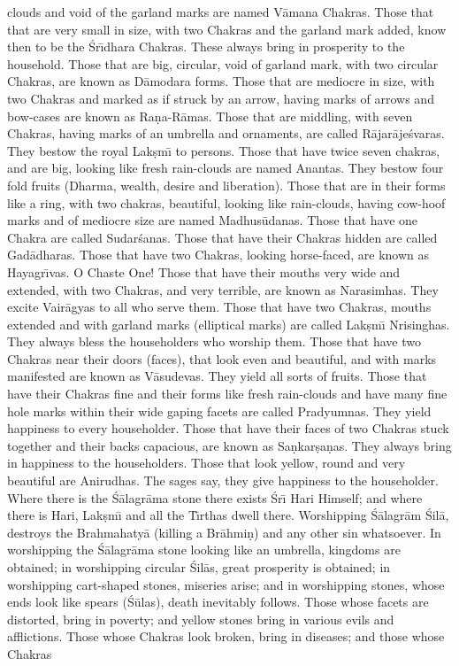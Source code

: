 clouds and void of the garland marks are named V\=amana Chakras. Those that that are very small in size, with two Chakras and the garland mark added, know then to be the \'Sr\={\i}dhara Chakras. These always bring in prosperity to the household. Those that are big, circular, void of garland mark, with two circular Chakras, are known as D\=amodara forms. Those that are mediocre in size, with two Chakras and marked as if struck by an arrow, having marks of arrows and bow-cases are known as Ra\d{n}a-R\=amas. Those that are middling, with seven Chakras, having marks of an umbrella and ornaments, are called R\=ajar\=aje\'svaras. They bestow the royal Lak\d{s}m\={\i} to persons. Those that have twice seven chakras, and are big, looking like fresh rain-clouds are named Anantas. They bestow four fold fruits (Dharma, wealth, desire and liberation). Those that are in their forms like a ring, with two chakras, beautiful, looking like rain-clouds, having cow-hoof marks and of mediocre size are named Madhus\=udanas. Those that have one Chakra are called Sudar\'sanas. Those that have their Chakras hidden are called Gad\=adharas. Those that have two Chakras, looking horse-faced, are known as Hayagr\={\i}vas. O Chaste One! Those that have their mouths very wide and extended, with two Chakras, and very terrible, are known as Narasimhas. They excite Vair\=agyas to all who serve them. Those that have two Chakras, mouths extended and with garland marks (elliptical marks) are called Lak\d{s}m\={\i} Nrisinghas. They always bless the householders who worship them. Those that have two Chakras near their doors (faces), that look even and beautiful, and with marks manifested are known as V\=asudevas. They yield all sorts of fruits. Those that have their Chakras fine and their forms like fresh rain-clouds and have many fine hole marks within their wide gaping facets are called Pradyumnas. They yield happiness to every householder. Those that have their faces of two Chakras stuck together and their backs capacious, are known as Sa\d{n}kar\d{s}a\d{n}as. They always bring in happiness to the householders. Those that look yellow, round and very beautiful are Anirudhas. The sages say, they give happiness to the householder. Where there is the \'S\=alagr\=ama stone there exists \'Sr\={\i} Hari Himself; and where there is Hari, Lak\d{s}m\={\i} and all the T\={\i}rthas dwell there. Worshipping \'S\=alagr\=am \'Sil\=a, destroys the Brahmahaty\=a (killing a Br\=ahmi\d{n}) and any other sin whatsoever. In worshipping the \'S\=alagr\=ama stone looking like an umbrella, kingdoms are obtained; in worshipping circular \'Sil\=as,
great prosperity is obtained; in worshipping cart-shaped stones, miseries arise; and in worshipping stones, whose ends look like spears (\'S\=ulas), death inevitably follows. Those whose facets are distorted, bring in poverty; and yellow stones bring in various evils and afflictions. Those whose Chakras look broken, bring in diseases; and those whose Chakras

